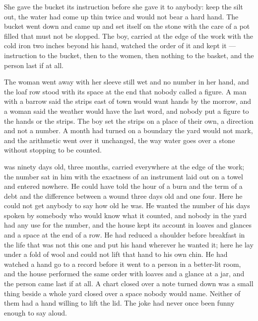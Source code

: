 She gave the bucket its instruction before she gave it to anybody: keep the silt out, the water had come up thin twice and would not bear a hard hand. The bucket went down and came up and set itself on the stone with the care of a pot filled that must not be slopped. The boy, carried at the edge of the work with the cold iron two inches beyond his hand, watched the order of it and kept it --- instruction to the bucket, then to the women, then nothing to the basket, and the person last if at all.

The woman went away with her sleeve still wet and no number in her hand, and the loaf row stood with its space at the end that nobody called a figure. A man with a barrow said the strips east of town would want hands by the morrow, and a woman said the weather would have the last word, and nobody put a figure to the hands or the strips. The boy set the strips on a place of their own, a direction and not a number. A month had turned on a boundary the yard would not mark, and the arithmetic went over it unchanged, the way water goes over a stone without stopping to be counted.

 was ninety days old, three months, carried everywhere at the edge of the work; the number sat in him with the exactness of an instrument laid out on a towel and entered nowhere. He could have told the hour of a burn and the term of a debt and the difference between a wound three days old and one four. Here he could not get anybody to say how old he was. He wanted the number of his days spoken by somebody who would know what it counted, and nobody in the yard had any use for the number, and the house kept its account in loaves and glances and a space at the end of a row. He had reduced a shoulder before breakfast in the life that was not this one and put his hand wherever he wanted it; here he lay under a fold of wool and could not lift that hand to his own chin. He had watched a hand go to a record before it went to a person in a better-lit room, and the house performed the same order with loaves and a glance at a jar, and the person came last if at all. A chart closed over a note turned down was a small thing beside a whole yard closed over a space nobody would name. Neither of them had a hand willing to lift the lid. The joke had never once been funny enough to say aloud.

